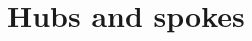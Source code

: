 \documentclass[hott-all.tex]{subfiles}
\begin{document}
\section{Hubs and spokes}
% 
% 
% 
% 
% 
\end{document}

